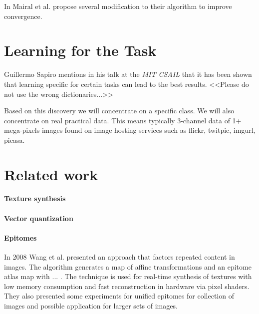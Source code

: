 In \cite{Mairal2010} Mairal et al. propose several modification to their
algorithm to improve convergence.



\section{Learning for the Task}
\label{sec:learnForTheTask}
Guillermo Sapiro mentions in his talk\cite{sapiroSlides} at the \emph{MIT CSAIL}
that it has been shown that learning specific for certain tasks can lead to the
best results. <<Please do not use the wrong dictionaries...>>

Based on this discovery we will concentrate on a specific class. 
We will also concentrate on real practical data. This means typically 3-channel
data of 1+ mega-pixels images found on image hosting services such as flickr,
twitpic, imgurl, picasa.


\section{Related work}

\paragraph{Texture synthesis}\cite{Peyre2008}

\paragraph{Vector quantization}

\paragraph{Epitomes} In 2008 Wang et al.\cite{Wang2008a} presented
an approach that factors repeated content in images. The algorithm generates 
a map of affine transformations and an epitome atlas map with ... . The
technique is used for real-time synthesis of textures with low memory
consumption and  fast reconstruction in hardware via pixel shaders. They also
presented some experiments for unified epitomes for collection of images and
possible application for larger sets of images. 

